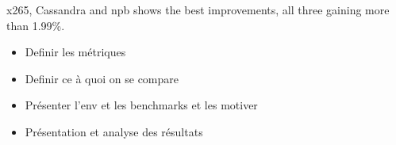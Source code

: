 
x265, Cassandra and npb shows the best improvements, all three gaining more than 1.99\%. 
\begin{itemize}
        \item Definir les métriques
        \item Definir ce à quoi on se compare
        \item Présenter l'env et les benchmarks et les motiver
        \item Présentation et analyse des résultats
\end{itemize}


